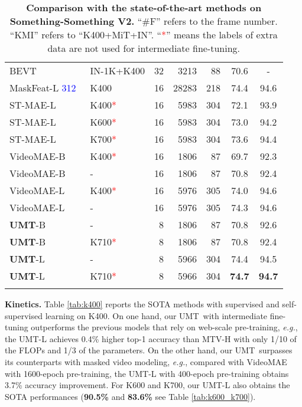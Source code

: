 \documentclass[10pt,twocolumn,letterpaper]{article}
\def\Modelnamelight{UMT}
\def\Modelname{\textbf{UMT}}
\newcommand{\red}[1]{\textcolor{red}{#1}}
\newcommand{\blue}[1]{\textcolor{blue}{#1}}
\begin{document}
\begin{table}[!t]
{\begin{tabular}{l|l|r|r|r|cc}
        BEVT~\cite{bevt} & IN-1K+K400 & 32 & 3213 & 88 & 70.6 & - \\
        \scriptsize{MaskFeat-L \blue{312}}~\cite{maskfeat} & K400 & 16 & 28283 & 218 & 74.4 & 94.6 \\
        ST-MAE-L~\cite{st_mae} & K400\red{*} & 16 & 5983 & 304 & 72.1 & 93.9 \\
        ST-MAE-L~\cite{st_mae} & K600\red{*} & 16 & 5983 & 304 & 73.0 & 94.2 \\
        ST-MAE-L~\cite{st_mae} & K700\red{*} & 16 & 5983 & 304 & 73.6 & 94.4 \\
        VideoMAE-B~\cite{videomae} & K400\red{*} & 16 & 1806 & 87 & 69.7 & 92.3 \\
        VideoMAE-B~\cite{videomae} & - & 16 & 1806 & 87 & 70.8 & 92.4 \\
        VideoMAE-L~\cite{videomae} & K400\red{*}  & 16 & 5976 & 305 & 74.0 & 94.6 \\
        VideoMAE-L~\cite{videomae} & - & 16 & 5976 & 305 & 74.3 & 94.6 \\
        \hline
        \Modelname-B & - & 8 & 1806 & 87 & 70.8 & 92.6 \\
        \Modelname-B & K710\red{*} & 8 & 1806 & 87 & 70.8 & 92.4 \\
        \Modelname-L & - & 8 & 5966 & 304 & 74.4 & 94.5 \\
        \Modelname-L & K710\red{*} & 8 & 5966 & 304 & \textbf{74.7} & \textbf{94.7} \\
        \Xhline{1.0pt}
        \end{tabular}
    }
    \vspace{-0.3cm}
    \caption{\textbf{Comparison with the state-of-the-art methods on Something-Something V2.} ``\#F'' refers to the frame number. 
    ``KMI'' refers to ``K400+MiT+IN''. 
    ``\red{*}'' means the labels of extra data are not used for intermediate fine-tuning.
    }
    \label{tab:ssv2}
    \vspace{-0.4cm}
\end{table} 
\textbf{Kinetics.}
Table \ref{tab:k400} reports the SOTA methods with supervised and self-supervised learning on K400.
On one hand,
our \Modelnamelight\  with intermediate fine-tuning outperforms the previous models that rely on web-scale pre-training,
\textit{e.g.},
the \Modelnamelight-L achieves 0.4\% higher top-1 accuracy than MTV-H \cite{mtv} with only 1/10 of the FLOPs and 1/3 of the parameters.
On the other hand,
our \Modelnamelight\  surpasses its counterparts with masked video modeling,
\textit{e.g.},
compared with VideoMAE \cite{videomae} with 1600-epoch pre-training,
the \Modelnamelight-L with 400-epoch pre-training obtains 3.7\% accuracy improvement.
For K600 and K700,
our \Modelnamelight-L also obtains the SOTA performances (\textbf{90.5\%} and \textbf{83.6\%} see Table \ref{tab:k600_k700}).
\end{document}
